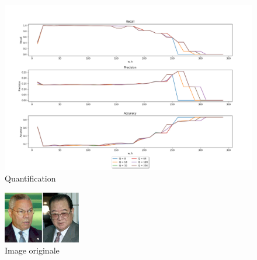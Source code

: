 \documentclass[a4paper,12pt, openany]{book}
\theoremstyle{break}
\begin{document}
\begin{figure}[H]
  \includegraphics[width=\textwidth]{images/compare_quantification}
  \caption{Quantification}
  \label{fig:quant}
\end{figure}

\begin{figure}[H]
\centering
\includegraphics[width=0.3\textwidth]{images/quantified_original.png}
\caption{Image originale}
\end{figure}
\end{document}
